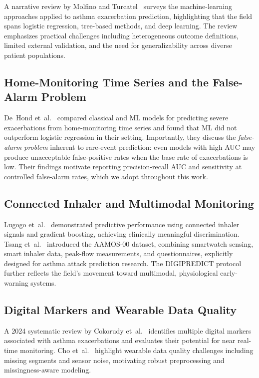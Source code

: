 \documentclass[11pt,a4paper]{article}
\begin{document}
A narrative review by Molfino and Turcatel~\cite{molfino2024} surveys the
machine-learning approaches applied to asthma exacerbation prediction,
highlighting that the field spans logistic regression, tree-based methods, and
deep learning.  The review emphasizes practical challenges including
heterogeneous outcome definitions, limited external validation, and the need
for generalizability across diverse patient populations.

\subsection{Home-Monitoring Time Series and the False-Alarm Problem}

De~Hond et~al.~\cite{dehond2022} compared classical and ML models for
predicting severe exacerbations from home-monitoring time series and found that
ML did not outperform logistic regression in their setting.  Importantly, they
discuss the \emph{false-alarm problem} inherent to rare-event prediction: even
models with high AUC may produce unacceptable false-positive rates when the base
rate of exacerbations is low.  Their findings motivate reporting
precision-recall AUC and sensitivity at controlled false-alarm rates, which we
adopt throughout this work.

\subsection{Connected Inhaler and Multimodal Monitoring}

Lugogo et~al.~\cite{lugogo2022} demonstrated predictive performance using
connected inhaler signals and gradient boosting, achieving clinically meaningful
discrimination.  Tsang et~al.~\cite{tsang2023} introduced the AAMOS-00
dataset, combining smartwatch sensing, smart inhaler data, peak-flow
measurements, and questionnaires, explicitly designed for asthma attack
prediction research.  The DIGIPREDICT protocol~\cite{chan2024} further reflects
the field's movement toward multimodal, physiological early-warning systems.

\subsection{Digital Markers and Wearable Data Quality}

A 2024 systematic review by Cokorudy et~al.~\cite{cokorudy2024} identifies
multiple digital markers associated with asthma exacerbations and evaluates
their potential for near real-time monitoring.  Cho et~al.~\cite{cho2021}
highlight wearable data quality challenges including missing segments and
sensor noise, motivating robust preprocessing and missingness-aware modeling.
\end{document}
